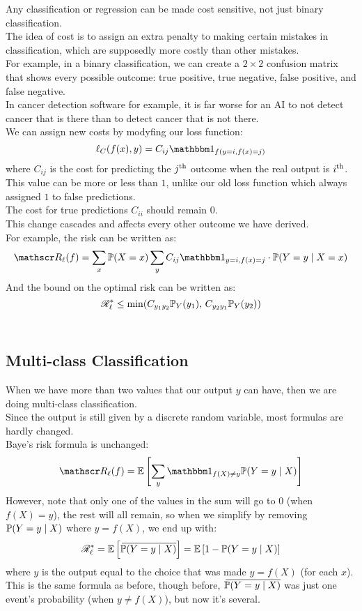 \documentclass[12pt]{article}
\begin{document}
Any classification or regression can be
made cost sensitive,
not just binary classification. \\

The idea of cost is to assign an extra penalty
to making certain mistakes in classification,
which are supposedly more costly than other
mistakes. \\
For example, in a binary classification,
we can create a $2 \times 2$ confusion matrix
that shows every possible outcome:
true positive, true negative, false positive,
and false negative. \\
In cancer detection software for example,
it is far worse for an AI to not detect cancer
that is there than to detect cancer that is not
there. \\

We can assign new costs
by modyfing our loss function:
\[ \ell_C(f(x), y) = 
C_{ij}\indicator_{f(y = i, f(x) = j)} \]
where $C_{ij}$
is the cost for predicting
the $j^{\text{th}}$ outcome
when the real output is $i^{\text{th}}$. \\
This value can be more or less than $1$,
unlike our old loss function which always
assigned $1$ to false predictions. \\
The cost for true predictions $C_{ii}$
should remain $0$. \\

This change cascades and affects
every other outcome we have derived. \\
For example,
the risk can be written as:
\[ \rscr_\ell(f)
= \sum_{x} \Pb(X = x)
\sum_{y} C_{ij}\indicator_{y = i, f(x) = j}\cdot
\Pb(Y = y \mid X = x) \]
And the bound on the optimal risk can be
written as:
\[ \mathscr{R}_\ell^* \leq \min(
C_{y_1y_2}\mathbb{P}_Y(y_1), \, 
C_{y_2y_1}\mathbb{P}_Y(y_2)) \] \\

\newpage

\subsection*{Multi-class Classification}

When we have more than two values that
our output $y$ can have,
then we are doing multi-class classification. \\

Since the output is still given by a discrete
random variable, most formulas
are hardly changed. \\

Baye's risk formula is
unchanged:
\[ \rscr_\ell(f)
= \E\brac{\sum_y \indicator_{f(X) \neq y}
\Pb(Y = y \mid X)} \]
However, note that only one
of the values in the sum will go to 0
(when $f(X) = y$),
the rest will all remain,
so when we simplify by removing
$\mathbb{P}(Y = y \mid X)$
where $y = f(X)$,
we end up with:
\[ \mathscr{R}_\ell^*
= \mathbb{E}\left[ 
\,\overline{\!{\mathbb{P}(Y = y \mid X)}} \right]
= \mathbb{E}\left[ 
1 - \mathbb{P}(Y = y \mid X) \right] \]
where $y$ is the output
equal to the choice that was made
$y = f(X)$ (for each $x$). \\
This is the same formula as before,
though before, $\,\overline{\!{\mathbb{P}(Y = y \mid X)}}$
was just one event's probability
(when $y \neq f(X)$),
but now it's several. \\
\end{document}
